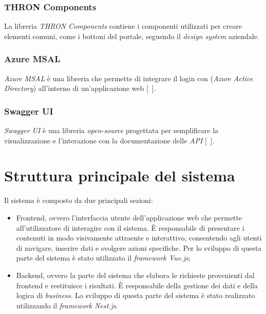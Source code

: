 \subsubsection{THRON Components}\label{subsubsec:thron-components}
La libreria \textit{THRON Components} contiene i componenti utilizzati per creare elementi comuni, come i bottoni del portale, seguendo il \textit{design system} aziendale.
\subsubsection{Azure MSAL}\label{subsubsec:azure-MSAL}
\textit{Azure MSAL} è una libreria che permette di integrare il login con  (\textit{Azure Active Directory}) all'interno di un'applicazione web [~\cite{site:msal}].
\subsubsection{Swagger UI}\label{subsubsec:swagger-ui}
\textit{Swagger UI} è una libreria \textit{open-source} progettata per semplificare la visualizzazione e l'interazione con la documentazione delle \textit{API} [~\cite{site:swagger}].

\section{Struttura principale del sistema}\label{sec:struttura-principale-sistema}
Il sistema è composto da due principali sezioni:
\begin{itemize}
  \item Frontend, ovvero l'interfaccia utente dell'applicazione web che permette all'utilizzatore di interagire con il sistema. È responsabile di presentare i contenuti in modo visivamente attraente e interattivo, consentendo agli utenti di navigare, inserire dati e svolgere azioni specifiche. Per lo
  sviluppo di questa parte del sistema è stato utilizzato il \textit{framework Vue.js};
  \item Backend, ovvero la parte del sistema che elabora le richieste provenienti dal frontend e restituisce i risultati. È responsabile della gestione dei dati e della logica di \textit{business}.
  Lo sviluppo di questa parte del sistema è stato realizzato utilizzando il \textit{framework Nest.js}. 
\end{itemize}

